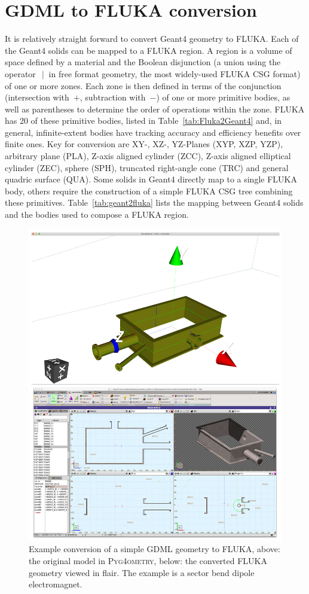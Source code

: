 \documentclass[final,5p,times,twocolumn]{elsarticle}
\newcommand{\PYGEOMETRY}{\textsc{Pyg4ometry}}
\begin{document}
\section{GDML to FLUKA conversion}
It is relatively straight forward to convert Geant4 geometry to FLUKA. Each
of the Geant4 solids can be mapped to a FLUKA region.  A region is a volume
of space defined by a material and the Boolean disjunction (a union using
the operator~$\:|\:$ in free format geometry, the most widely-used FLUKA
CSG format) of one or more zones. Each zone is then defined in terms
of the conjunction (intersection with~$+$, subtraction with~$-$) of one or
more primitive bodies, as well as parentheses to determine the order of
operations within the zone.  FLUKA has 20 of these primitive bodies, listed
in Table~\ref{tab:Fluka2Geant4} and, in general, infinite-extent bodies
have tracking accuracy and efficiency benefits over finite ones. Key for
conversion are XY-, XZ-, YZ-Planes (XYP, XZP, YZP), arbitrary plane (PLA),
Z-axis aligned cylinder (ZCC), Z-axis aligned elliptical cylinder (ZEC),
sphere (SPH), truncated right-angle cone (TRC) and general quadric surface
(QUA). Some solids in Geant4 directly map to a single FLUKA body, others
require the construction of a simple FLUKA CSG tree combining these
primitives. Table~\ref{tab:geant2fluka} lists the mapping between Geant4
solids and the bodies used to compose a FLUKA region.
\begin{figure}
\begin{center}
\includegraphics[width=0.9\columnwidth]{./model-scene/CuboidalChamber.pdf}
\caption{Example conversion of a simple GDML geometry to FLUKA, above:
the original model in \PYGEOMETRY{}, below: the converted FLUKA geometry
viewed in flair. The example is a sector bend dipole electromagnet.}
\label{fig:gdml-flair}
\end{center}
\end{figure}
\end{document}
